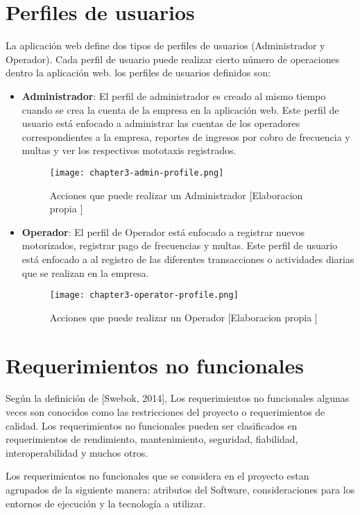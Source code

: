 \section{Perfiles de usuarios}
\noindent La aplicación web define dos tipos de perfiles de usuarios (Administrador y Operador). Cada perfil de  usuario puede realizar cierto número de operaciones dentro la aplicación web.
\noindent los perfiles de usuarios definidos son:
\begin{itemize}
\item \textbf{Administrador}: El perfil de administrador es creado al mismo tiempo cuando se crea la cuenta de la empresa en la aplicación web. Este perfil de usuario está enfocado a administrar las cuentas de los operadores correspondientes a la empresa, reportes de ingresos por cobro de frecuencia y multas y ver los respectivos mototaxis registrados.
\begin{figure}[ht]
  \centering
  \texttt{[image: chapter3-admin-profile.png]}
  \caption{Acciones que puede realizar un Administrador [Elaboracion propia ]}  
\end{figure}
\item \textbf{Operador}: El perfil de Operador está enfocado a registrar nuevos motorizados, registrar pago de frecuencias y multas. Este perfil de usuario está enfocado a al registro de las diferentes transacciones o actividades diarias que se realizan en la empresa.
\begin{figure}[ht]
  \centering
  \texttt{[image: chapter3-operator-profile.png]}
  \caption{Acciones que puede realizar un Operador [Elaboracion propia ]}  
\end{figure}
\end{itemize}
\section{Requerimientos no funcionales}
\noindent Según la definición de [Swebok, 2014], Los requerimientos no funcionales algunas veces son conocidos como las restricciones del proyecto o requerimientos de calidad. Los requerimientos no funcionales pueden ser clasificados en requerimientos de rendimiento, mantenimiento, seguridad, fiabilidad, interoperabilidad y muchos otros.

\noindent Los requerimientos no funcionales que se considera en el proyecto estan agrupados de la siguiente manera: atributos del Software, consideraciones para los entornos de ejecución y la tecnología a utilizar.

